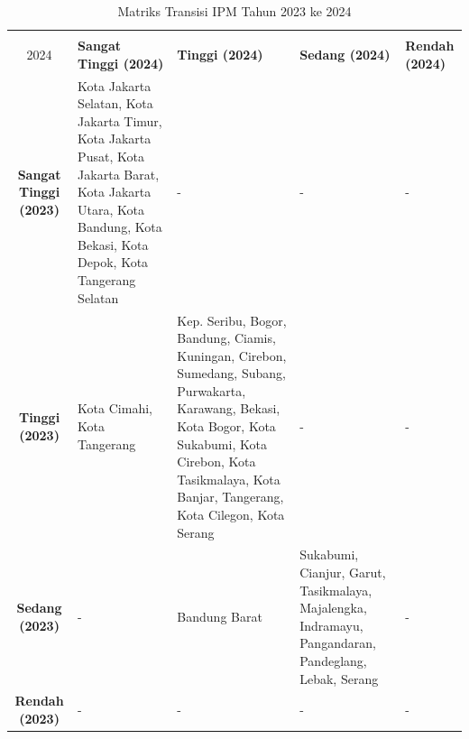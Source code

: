 \begin{table}[H]
\centering
\caption{Matriks Transisi IPM Tahun 2023 ke 2024} \label{tab:ipm_transisi_2023_2024}
\begin{tabular}{|c|p{2cm}|p{2cm}|p{2cm}|p{2cm}|}
\hline
\textbf{Tahun 2023 \\ 2024} & \textbf{Sangat Tinggi (2024)} & \textbf{Tinggi (2024)} & \textbf{Sedang (2024)} & \textbf{Rendah (2024)} \\ \hline
\textbf{Sangat Tinggi (2023)} & Kota Jakarta Selatan, Kota Jakarta Timur, Kota Jakarta Pusat, Kota Jakarta Barat, Kota Jakarta Utara, Kota Bandung, Kota Bekasi, Kota Depok, Kota Tangerang Selatan & - & - & - \\ \hline
\textbf{Tinggi (2023)} & Kota Cimahi, Kota Tangerang & Kep. Seribu, Bogor, Bandung, Ciamis, Kuningan, Cirebon, Sumedang, Subang, Purwakarta, Karawang, Bekasi, Kota Bogor, Kota Sukabumi, Kota Cirebon, Kota Tasikmalaya, Kota Banjar, Tangerang, Kota Cilegon, Kota Serang & - & - \\ \hline
\textbf{Sedang (2023)} & - & Bandung Barat & Sukabumi, Cianjur, Garut, Tasikmalaya, Majalengka, Indramayu, Pangandaran, Pandeglang, Lebak, Serang & - \\ \hline
\textbf{Rendah (2023)} & - & - & - & - \\ \hline
\end{tabular}
\end{table}